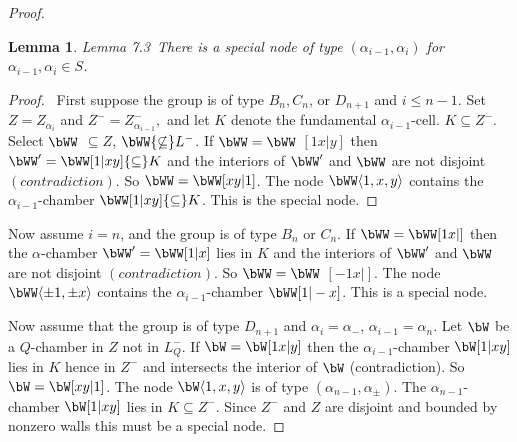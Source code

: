 \documentclass{memo-l}
\newtheorem{lemma}[theorem]{Lemma}
\theoremstyle{definition}
\theoremstyle{remark}
\numberwithin{section}{chapter}
\numberwithin{equation}{chapter}
\begin{document}
\begin{proof}
\begin{lemma}{Lemma 7.3}\ There is a special node of type
$({\alpha}_{i-1},{\alpha}_{i})$ for ${\alpha}_{i-1},{\alpha}_{i}  \in  S$.
\end{lemma}


\begin{proof} \ First suppose the group is of type $B_{n}, C_{n}$, or
$D_{n+1}$ and $i\le n-1$.  Set $Z = Z_{\alpha_i}$ and $Z^{-} =
Z^{-}_{\alpha_{i-1}},$ and let $K$ denote the fundamental
${\alpha}_{i-1}$-cell.  $K {\subseteq} Z^{-}$.  Select $\bWW$
${\subseteq}Z$, $\bWW{\not\subseteq}L^{-}$.  If $\bWW = \bWW$
$[1x\vert y]$ then $\bWW'= \bWW[1\vert xy]{\subseteq}K$ and the
interiors of $\bWW'$ and $\bWW$ are not disjoint $(contradiction)$.
So $\bWW = \bWW[xy\vert 1]$.  The node $\bWW\langle 1,x,y\rangle$
contains the ${\alpha_{i-1}}$-chamber $\bWW[1\vert xy]{\subseteq}K$.  This
is the special node.
\end{proof}

	   \medskip
	   \medskip



   Now assume $i = n$, and the group is of type $B_{n}$ or $C_{n}$.  If
$\bWW = \bWW[1x\vert ]$ then the
${\alpha}$-chamber $\bWW'=
\bWW[1\vert x]$ lies in $K$ and the interiors of $\bWW'$ and
$\bWW$ are not disjoint $(contradiction)$.  So $\bWW = \bWW$
$[-1x\vert ]$.  The node $\bWW\langle{\pm}1,{\pm}x\rangle$ contains the
${\alpha_{i-1}}$-chamber $\bWW[1\vert -x]$.  This is a special
node.

\medskip
\medskip







   Now assume that the group is of type $D_{n+1}$ and
${\alpha_i} = {\alpha}_{-}$, $\alpha_{i-1}=\alpha_n$.
Let $\bW$ be a $Q$-chamber in
$Z$ not in
$L_{Q}^{-}$.  If $\bW = \bW [1x\vert y]$
then the ${\alpha_{i-1}}$-chamber
$\bW[1\vert xy]$ lies in $K$ hence in $Z^{-}$ and
intersects the interior of $\bW$ (contradiction).
So $\bW = \bW [xy\vert 1]$.
The node $\bW\langle 1,x,y\rangle $ is of type
$({\alpha}_{n-1},{\alpha}_{\pm})$.
The ${\alpha}_{n-1}$-chamber $\bW[1\vert xy]$ lies in
$K \subseteq Z^{-}$.  Since $Z^{-}$ and $Z$ are disjoint and bounded by
nonzero walls this must be a special node.

		      \medskip
		      \medskip


\end{proof}
\end{document}

